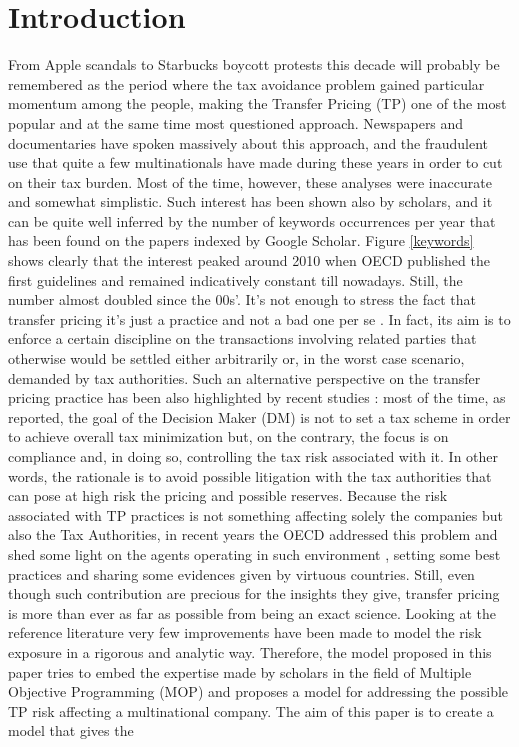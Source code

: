\documentclass[conference,final,]{IEEEtran}
\begin{document}
\maketitle

\IEEEpeerreviewmaketitle


\hypertarget{introduction}{%
\section{Introduction}\label{introduction}}
From Apple scandals \cite{leswing18} to Starbucks boycott protests \cite{campbell16} this decade will probably be remembered as the period where the tax avoidance problem gained particular momentum among the people, making the Transfer Pricing (TP) one of the most popular and at the same time most questioned approach. Newspapers and documentaries have spoken massively about this approach, and the fraudulent use that quite a few multinationals have made during these years in order to cut on their tax burden. Most of the time, however, these analyses were inaccurate and somewhat simplistic. Such interest has been shown also by scholars, and it can be quite well inferred by the number of keywords occurrences per year that has been found on the papers indexed by Google Scholar. Figure \ref{keywords} shows clearly that the interest peaked around 2010 when OECD published the first guidelines \cite{oecd10} and remained indicatively constant till nowadays. Still, the number almost doubled since the 00s'. It's not enough to stress the fact that transfer pricing it's just a practice and not a bad one per se \cite{oecd15}. In fact, its aim is to enforce a certain discipline on the transactions involving related parties that otherwise would be settled either arbitrarily or, in the worst case scenario, demanded by tax authorities. Such an alternative perspective on the transfer pricing practice has been also highlighted by recent studies \cite{klassen16}: most of the time, as reported, the goal of the Decision Maker (DM) is not to set a tax scheme in order to achieve overall tax minimization but, on the contrary, the focus is on compliance and, in doing so, controlling the tax risk associated with it. In other words, the rationale is to avoid possible litigation with the tax authorities that can pose at high risk the pricing and possible reserves. Because the risk associated with TP practices is not something affecting solely the companies but also the Tax Authorities, in recent years the OECD addressed this problem and shed some light on the agents operating in such environment \cite{oecd12}, setting some best practices and sharing some evidences given by virtuous countries. Still, even though such contribution are precious for the insights they give, transfer pricing is more than ever as far as possible from being an exact science. Looking at the reference literature very few improvements have been made to model the risk exposure in a rigorous and analytic way. Therefore, the model proposed in this paper tries to embed the expertise made by scholars in the field of Multiple Objective Programming (MOP) and proposes a model for addressing the possible TP risk affecting a multinational company. The aim of this paper is to create a model that gives the 
\end{document}
